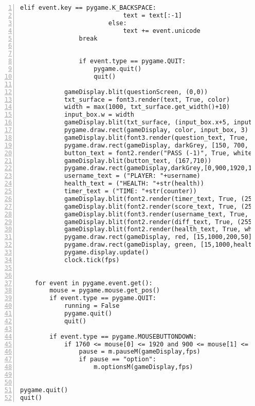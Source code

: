 \documentclass[12pt]{report}
\begin{document}
\begin{Verbatim}[numbers=left, frame=single]
                        elif event.key == pygame.K_BACKSPACE:
                            text = text[:-1]
                        else:
                            text += event.unicode
                break

            
                if event.type == pygame.QUIT:
                    pygame.quit()
                    quit()
            
            gameDisplay.blit(questionScreen, (0,0))
            txt_surface = font3.render(text, True, color)                                        
            width = max(1000, txt_surface.get_width()+10)                                        
            input_box.w = width
            gameDisplay.blit(txt_surface, (input_box.x+5, input_box.y+5))                       
            pygame.draw.rect(gameDisplay, color, input_box, 3)                                  
            gameDisplay.blit(font3.render(question_text, True, (255, 255, 255)), (80, 70))
            pygame.draw.rect(gameDisplay, darkGrey, [150, 700, 250 , 50])
            button_text = font2.render("PASS (-1)", True, white)
            gameDisplay.blit(button_text, (167,710))
            pygame.draw.rect(gameDisplay,darkGrey,[0,900,1920,180])
            username_text = ("PLAYER: "+username)
            health_text = ("HEALTH: "+str(health))
            timer_text = ("TIME: "+str(counter))
            gameDisplay.blit(font2.render(timer_text, True, (255, 255, 255)), (700, 950))
            gameDisplay.blit(font2.render(score_text, True, (255, 255, 255)), (700, 920))
            gameDisplay.blit(font3.render(username_text, True, white), (15,930))
            gameDisplay.blit(font2.render(diff_text, True, (255, 255, 255)), (700, 1010))
            gameDisplay.blit(font2.render(health_text, True, white), (700, 980))
            pygame.draw.rect(gameDisplay, red, [15,1000,200,50])
            pygame.draw.rect(gameDisplay, green, [15,1000,health,50])
            pygame.display.update()                                                             
            clock.tick(fps)
                
        
    for event in pygame.event.get():
        mouse = pygame.mouse.get_pos()
        if event.type == pygame.QUIT:                                                           
            running = False
            pygame.quit()
            quit()

        if event.type == pygame.MOUSEBUTTONDOWN:
            if 1760 <= mouse[0] <= 1920 and 900 <= mouse[1] <= 1080:
                pause = m.pauseM(gameDisplay,fps)
                if pause == "option":
                    m.optionsM(gameDisplay,fps)


pygame.quit()                                                                                   
quit()
\end{Verbatim}
\normalsize
\end{document}
